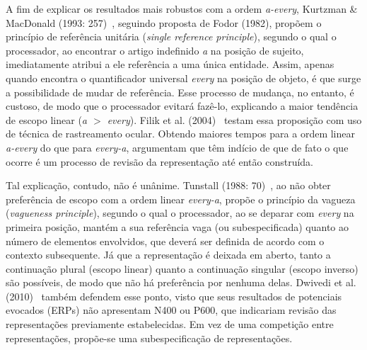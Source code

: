 A fim de explicar os resultados mais robustos com a ordem \emph{a-every}, Kurtzman \& MacDonald (1993: 257)~\cite{KMac1993}, seguindo proposta de Fodor (1982), propõem o princípio de referência unitária (\emph{single reference principle}), segundo o qual o processador, ao encontrar o artigo indefinido \emph{a} na posição de sujeito, imediatamente atribui a ele referência a uma única entidade. Assim, apenas quando encontra o quantificador universal \emph{every} na posição de objeto, é que surge a possibilidade de mudar de referência. Esse processo de mudança, no entanto, é custoso, de modo que o processador evitará fazê-lo, explicando a maior tendência de escopo linear (\emph{a $>$ every}). Filik et al. (2004)~\cite{filik2004} testam essa proposição com uso de técnica de rastreamento ocular. Obtendo maiores tempos para a ordem linear \emph{a-every} do que para \emph{every-a}, argumentam que têm indício de que de fato o que ocorre é um processo de revisão da representação até então construída.

Tal explicação, contudo, não é unânime. Tunstall (1988: 70)~\cite{Tunstall1998}, ao não obter preferência de escopo com a ordem linear \emph{every-a}, propõe o princípio da vagueza (\emph{vagueness principle}), segundo o qual o processador, ao se deparar com \emph{every} na primeira posição, mantém a sua referência vaga (ou subespecificada) quanto ao número de elementos envolvidos, que deverá ser definida de acordo com o contexto subsequente. Já que a representação é deixada em aberto, tanto a continuação plural (escopo linear) quanto a continuação singular (escopo inverso) são possíveis, de modo que não há preferência por nenhuma delas. Dwivedi et al. (2010)~\cite{Dwivedi2010} também defendem esse ponto, visto que seus resultados de potenciais evocados (ERPs) não apresentam N400 ou P600, que indicariam revisão das representações previamente estabelecidas. Em vez de uma competição entre representações, propõe-se uma subespecificação de representações.
